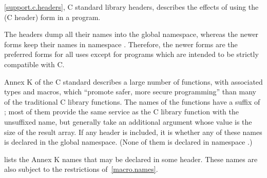\pnum
\ref{support.c.headers}, C standard library headers, describes the effects of using
the  (C header) form in a \Cpp{} program.
\begin{footnote}
 The
 headers dump all their names into the global namespace, whereas the
newer forms keep their names in namespace . Therefore, the newer
forms are the preferred forms for all uses except for \Cpp{} programs which are
intended to be strictly compatible with C.
\end{footnote}

\pnum
Annex K of the C standard describes a large number of functions,
with associated types and macros,
which ``promote safer, more secure programming''
than many of the traditional C library functions.
The names of the functions have a suffix of ;
most of them provide the same service
as the C library function with the unsuffixed name,
but generally take an additional argument
whose value is the size of the result array.
If any \Cpp{} header is included,
it is 
whether any of these names
is declared in the global namespace.
(None of them is declared in namespace .)

\pnum
{} lists the Annex K names
that may be declared in some header.
These names are also subject to the restrictions of~\ref{macro.names}.

